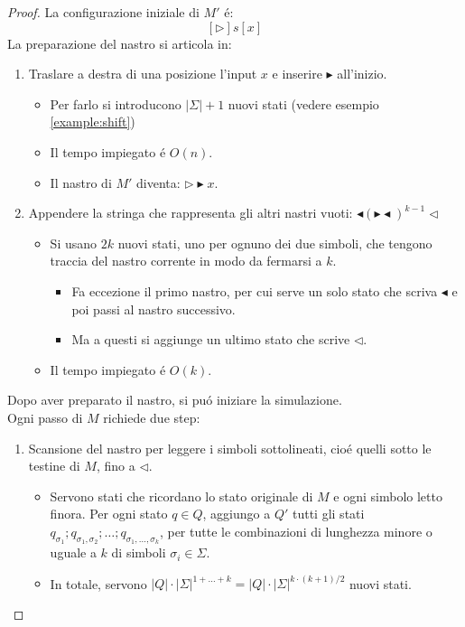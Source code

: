 \begin{proof}
La configurazione iniziale di $M'$ é: \[[\triangleright]s[x]\]
La preparazione del nastro si articola in:
\begin{enumerate}
	\item Traslare a destra di una posizione l'input $x$ e inserire $\blacktriangleright$ all'inizio.
		\begin{itemize}
			\item Per farlo si introducono $|\Sigma| + 1$ nuovi stati (vedere esempio \ref{example:shift})
			\item Il tempo impiegato é $O(n)$.
			\item Il nastro di $M'$ diventa: $\triangleright \blacktriangleright x$.
		\end{itemize} 
	\item Appendere la stringa che rappresenta gli altri nastri vuoti: $\blacktriangleleft ({\blacktriangleright \blacktriangleleft})^{k-1} \triangleleft$
		\begin{itemize}
			\item Si usano $2k$ nuovi stati, uno per ognuno dei due simboli, che tengono traccia del nastro corrente in modo da fermarsi a $k$. 
			\begin{itemize}
				\item Fa eccezione il primo nastro, per cui serve un solo stato che scriva $\blacktriangleleft$ e poi passi al nastro successivo. 
				\item Ma a questi si aggiunge un ultimo stato che scrive $\triangleleft$.
			\end{itemize}
			\item Il tempo impiegato é $O(k)$.
		\end{itemize}
\end{enumerate}
{
Dopo aver preparato il nastro, si puó iniziare la simulazione. \\
Ogni passo di $M$ richiede due step:
\begin{enumerate}
	\item Scansione del nastro per leggere i simboli sottolineati, cioé quelli sotto le testine di $M$, fino a $\triangleleft$.
		\begin{itemize}
			\item Servono stati che ricordano lo stato originale di $M$ e ogni simbolo letto finora. Per ogni stato $q \in Q$, aggiungo a $Q'$ tutti gli stati $q_{\sigma_1}; q_{\sigma_1, \sigma_2}; \dots; q_{\sigma_1, \dots, \sigma_k}$, per tutte le combinazioni di lunghezza minore o uguale a $k$ di simboli $\sigma_i \in \Sigma$. 
			\item In totale, servono $|Q| \cdot |\Sigma|^{1 + \dots + k} = |Q| \cdot |\Sigma|^{k \cdot (k+1)/2}$ nuovi stati.

\end{itemize}
\end{enumerate}}
\end{proof}
